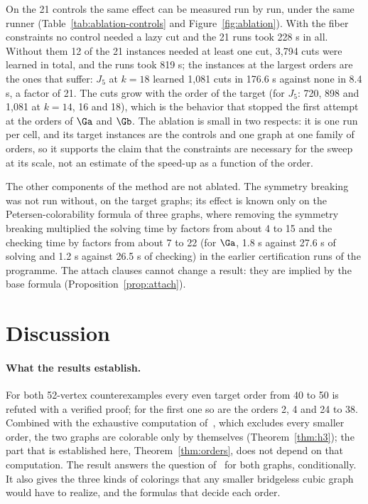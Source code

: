 
On the 21 controls the same effect can be measured run by run, under the same runner (Table~\ref{tab:ablation-controls} and Figure~\ref{fig:ablation}). With the fiber constraints no control needed a lazy cut and the 21 runs took 228 s in all. Without them 12 of the 21 instances needed at least one cut, 3{,}794 cuts were learned in total, and the runs took 819 s; the instances at the largest orders are the ones that
suffer: $J_5$ at $k = 18$ learned 1{,}081 cuts in 176.6 s against none in 8.4 s, a factor of 21. The cuts grow with the order of the target (for $J_5$: 720, 898 and 1{,}081 at $k = 14$, 16 and 18), which is the behavior that stopped the first attempt at the orders of $\Ga$ and $\Gb$. The ablation is small in two respects: it is one run per cell, and its target instances are the controls and one graph at one family of orders,
so it supports the claim that the constraints are necessary for the sweep at its scale, not an estimate of the speed-up as a function of the order.


The other components of the method are not ablated. The symmetry breaking was not run without, on the target graphs; its effect is known only on the Petersen-colorability formula of three graphs, where removing the symmetry breaking multiplied the solving time by factors from about 4 to 15 and the checking time by factors from about 7 to 22 (for $\Ga$, 1.8 s against 27.6 s of solving and 1.2 s against 26.5 s of checking)
in the earlier certification runs of the programme. The attach clauses cannot change a result: they are implied by the base formula (Proposition~\ref{prop:attach}).

\section{Discussion}\label{sec:discussion}

\paragraph{What the results establish.} For both 52-vertex counterexamples every even target order from 40 to 50 is refuted with a verified proof; for the first one so are the orders 2, 4 and 24 to 38. Combined with the exhaustive computation of~\cite{GJMMMU2026}, which excludes every smaller order, the two graphs are colorable only by themselves
(Theorem~\ref{thm:h3}); the part that is established here, Theorem~\ref{thm:orders}, does not depend on that computation. The result answers the question of~\cite[Section~5.4]{GJMMMU2026} for both graphs, conditionally. It also gives the three
kinds of colorings that any smaller bridgeless cubic graph would have to realize, and the formulas that decide each order.

